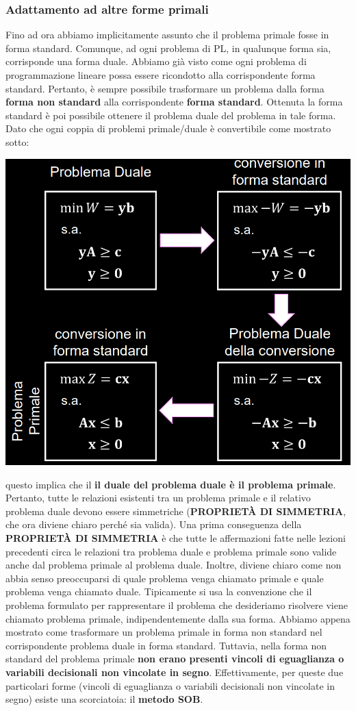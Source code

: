 \documentclass[12pt]{article}
\begin{document}
\subsubsection{Adattamento ad altre forme primali}
Fino ad ora abbiamo implicitamente assunto che il problema primale fosse in forma standard. Comunque, ad ogni problema di PL, in qualunque forma sia, corrisponde una forma duale.
Abbiamo già visto come ogni problema di programmazione lineare possa essere ricondotto alla corrispondente forma standard. Pertanto, è sempre possibile trasformare un problema dalla forma
\textbf{forma non standard} alla corrispondente \textbf{forma standard}. Ottenuta la forma standard è poi possibile ottenere il problema duale del problema in tale forma.
Dato che ogni coppia di problemi primale/duale è convertibile come mostrato sotto:
\begin{center}
    \includegraphics[width = 0.60\linewidth]{Images/58.png}
\end{center}
questo implica che il \textbf{il duale del problema duale è il problema primale}. Pertanto, tutte le relazioni esistenti tra un problema primale e il relativo problema duale devono essere
simmetriche (\textbf{PROPRIETÀ DI SIMMETRIA}, che ora diviene chiaro perché sia valida).
Una prima conseguenza della \textbf{PROPRIETÀ DI SIMMETRIA} è che tutte le affermazioni fatte nelle lezioni precedenti circa le relazioni tra problema duale e problema primale sono valide anche dal problema
primale al problema duale. Inoltre, diviene chiaro come non abbia senso preoccuparsi di quale problema venga chiamato primale e quale problema venga chiamato duale.
Tipicamente si usa la convenzione che il problema formulato per rappresentare il problema che desideriamo risolvere viene chiamato problema primale, indipendentemente dalla sua forma.
Abbiamo appena mostrato come trasformare un problema primale in forma non standard nel corrispondente problema duale in forma standard. Tuttavia, nella forma non standard del problema primale
\textbf{non erano presenti vincoli di eguaglianza o variabili decisionali non vincolate in segno}.
Effettivamente, per queste due particolari forme (vincoli di eguaglianza o variabili decisionali non vincolate in segno) esiste una scorciatoia: il \textbf{metodo SOB}.
\newpage
\end{document}
